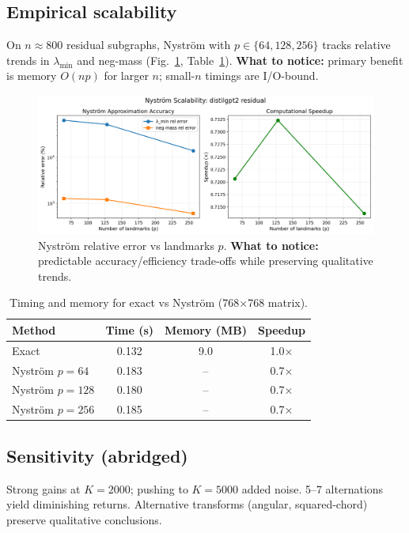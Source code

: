 \documentclass[11pt]{article}
\newcommand{\1}{\mathbf{1}}
\begin{document}
\subsection{Empirical scalability}
On $n\!\approx\!800$ residual subgraphs, Nyström with $p\in\{64,128,256\}$ tracks relative trends in $\lambda_{\min}$ and neg-mass (Fig.~\ref{fig:nystrom}, Table~\ref{tab:timing}). \textbf{What to notice:} primary benefit is memory $O(np)$ for larger $n$; small-$n$ timings are I/O-bound.

\begin{figure}[t]
\centering
\includegraphics[width=0.8\linewidth]{figs/nystrom_relerr_distilgpt2_residual.png}
\caption{Nyström relative error vs landmarks $p$. \textbf{What to notice:} predictable accuracy/efficiency trade-offs while preserving qualitative trends.}
\label{fig:nystrom}
\end{figure}

\begin{table}[t]
\centering
\caption{Timing and memory for exact vs Nyström (768×768 matrix).}
\label{tab:timing}
\begin{tabular}{lccc}
\toprule
Method & Time (s) & Memory (MB) & Speedup \\
\midrule
Exact & 0.132 & 9.0 & 1.0× \\
Nyström $p{=}64$ & 0.183 & -- & 0.7× \\
Nyström $p{=}128$ & 0.180 & -- & 0.7× \\
Nyström $p{=}256$ & 0.185 & -- & 0.7× \\
\bottomrule
\end{tabular}
\end{table}

\subsection{Sensitivity (abridged)}
Strong gains at $K{=}2000$; pushing to $K{=}5000$ added noise. 5--7 alternations yield diminishing returns. Alternative transforms (angular, squared-chord) preserve qualitative conclusions.
\end{document}
